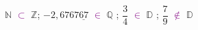 \documentclass[a4paper,11pt]{article}
\newcommand{\Z}{\mathbb{Z}}
\begin{document}
\hspace*{0.5cm}$\mathbb{N}$ \textcolor{purple}{$\subset$} $\Z$\hspace*{0.35cm}; \hspace*{0.35cm}  $-2,6767\underline{67}$ \textcolor{purple}{$\in$} $\mathbb{Q}$ \hspace*{0.35cm}; \hspace*{0.35cm} $\dfrac{3}{4}$ \textcolor{purple}{$\in$} $\mathbb{D	}$ \hspace*{0.35cm}; \hspace*{0.35cm} $\dfrac{7}{9}$ \textcolor{purple}{$\notin$} $\mathbb{D	}$ 
\end{document}
